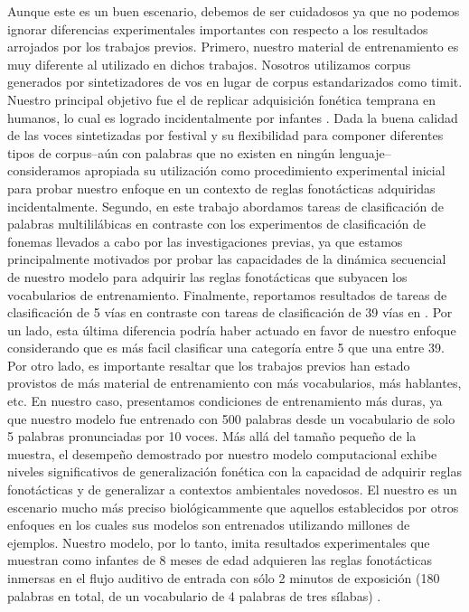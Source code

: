 Aunque este es un buen escenario, debemos de ser cuidadosos ya que no podemos ignorar diferencias experimentales importantes con respecto a los resultados arrojados por los trabajos previos. Primero, nuestro material de entrenamiento es muy diferente  al utilizado en dichos trabajos. Nosotros utilizamos corpus generados por sintetizadores de vos en lugar de corpus estandarizados como \gls{timit}.
Nuestro principal objetivo fue el de replicar adquisición fonética temprana en humanos, lo cual es logrado incidentalmente por infantes \cite{Saffran1996StatisticalLB}.
Dada la buena calidad de las voces sintetizadas por \gls{festival}  \cite{festival2014} y su flexibilidad para componer diferentes tipos de corpus--aún con palabras que no existen en ningún lenguaje--consideramos apropiada su utilización como procedimiento experimental inicial para probar nuestro enfoque en un contexto de reglas fonotácticas adquiridas incidentalmente.
Segundo, en este trabajo abordamos tareas de clasificación de palabras multililábicas en contraste con los experimentos de clasificación de fonemas llevados a cabo por las investigaciones previas, ya que estamos principalmente motivados por probar las capacidades de la dinámica secuencial de nuestro modelo para adquirir las reglas fonotácticas que subyacen los vocabularios de entrenamiento.
Finalmente, reportamos resultados de tareas de clasificación de 5 vías en contraste con tareas de clasificación de 39 vías en \cite{Lee:2009:UFL:2984093.2984217}.
Por un lado, esta última diferencia podría haber actuado en favor de nuestro enfoque considerando que es más facil clasificar una categoría entre 5 que una entre 39.
Por otro lado, es importante resaltar que los trabajos previos han estado provistos de más material de entrenamiento con más vocabularios, más hablantes, etc.
En nuestro caso, presentamos condiciones de entrenamiento más duras, ya que nuestro modelo fue entrenado con 500 palabras desde un vocabulario de solo 5 palabras pronunciadas por 10 voces.
Más allá del tamaño pequeño de la muestra, el desempeño demostrado por nuestro modelo computacional exhibe niveles significativos de generalización fonética con la capacidad de adquirir reglas fonotácticas y de generalizar a contextos ambientales novedosos. El nuestro es un escenario mucho más preciso biológicammente que aquellos establecidos por otros enfoques en los cuales sus modelos son entrenados utilizando millones de ejemplos. Nuestro modelo, por lo tanto, imita resultados experimentales que muestran como infantes de 8 meses de edad adquieren las reglas fonotácticas inmersas en el flujo auditivo de entrada con sólo 2 minutos de exposición (180 palabras en total, de un vocabulario de 4 palabras de tres sílabas) \cite{Saffran1996StatisticalLB}.

